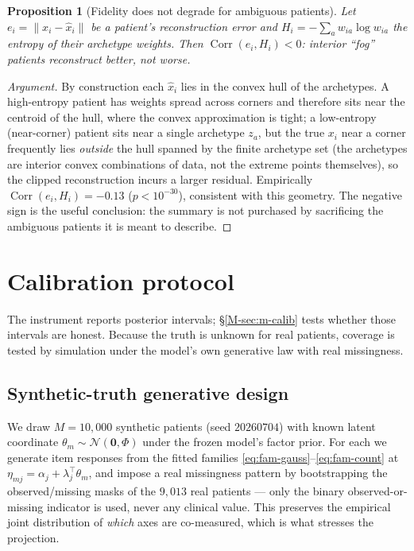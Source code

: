 \documentclass[11pt]{article}
\theoremstyle{plain}
\newtheorem{proposition}{Proposition}
\theoremstyle{definition}
\newcommand{\MSec}[1]{\S\ref{M-#1}}
\begin{document}
\begin{proposition}[Fidelity does not degrade for ambiguous patients]\label{prop:fog}
Let $e_i=\|x_i-\hat x_i\|$ be a patient's reconstruction error and
$H_i=-\sum_a w_{ia}\log w_{ia}$ the entropy of their archetype weights. Then
$\operatorname{Corr}(e_i,H_i)<0$: interior ``fog'' patients reconstruct \emph{better}, not
worse.
\end{proposition}
\begin{proof}[Argument]
By construction each $\hat x_i$ lies in the convex hull of the archetypes. A high-entropy
patient has weights spread across corners and therefore sits near the centroid of the hull,
where the convex approximation is tight; a low-entropy (near-corner) patient sits near a
single archetype $z_a$, but the true $x_i$ near a corner frequently lies \emph{outside} the
hull spanned by the finite archetype set (the archetypes are interior convex combinations of
data, not the extreme points themselves), so the clipped reconstruction incurs a larger
residual. Empirically $\operatorname{Corr}(e_i,H_i)=-0.13$ ($p<10^{-30}$), consistent with
this geometry. The negative sign is the useful conclusion: the summary is not purchased by
sacrificing the ambiguous patients it is meant to describe.
\end{proof}

\section{Calibration protocol}
\label{sec:calib}

The instrument reports posterior intervals; \MSec{sec:m-calib} tests whether those intervals
are honest. Because the truth is unknown for real patients, coverage is tested by simulation
under the model's own generative law with real missingness.

\subsection{Synthetic-truth generative design}
\label{sub:gen-calib}

We draw $M=10{,}000$ synthetic patients (seed $20260704$) with known latent coordinate
$\theta_m\sim\mathcal N(\mathbf 0,\Phi)$ under the frozen model's factor prior. For each we
generate item responses from the fitted families
\eqref{eq:fam-gauss}--\eqref{eq:fam-count} at $\eta_{mj}=\alpha_j+\lambda_j^{\top}\theta_m$,
and impose a real missingness pattern by bootstrapping the observed/missing masks of the
$9{,}013$ real patients --- only the binary observed-or-missing indicator is used, never any
clinical value. This preserves the empirical joint distribution of \emph{which} axes are
co-measured, which is what stresses the projection.
\end{document}
